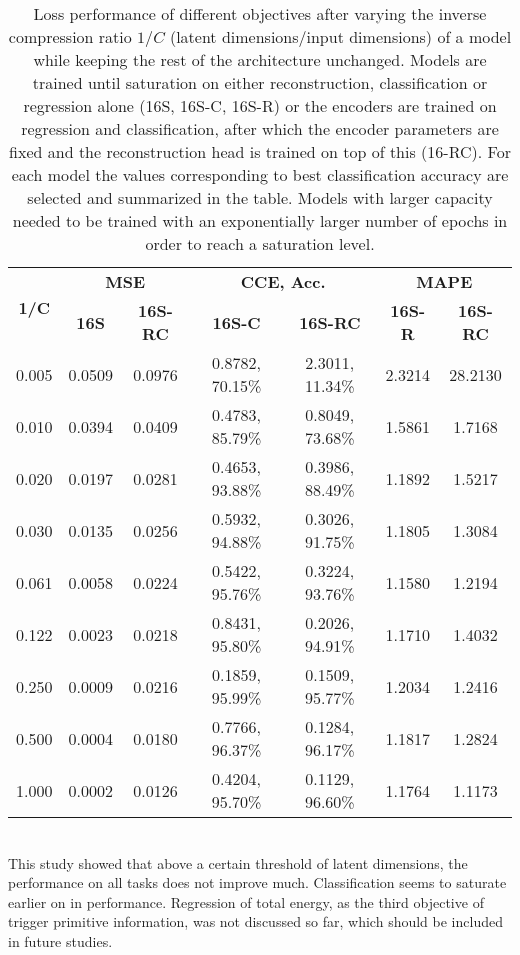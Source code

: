 \documentclass[../../main.tex]{subfiles}
\begin{document}
\begin{table}[htp]
	\centering
	\caption{Loss performance of different objectives after varying the inverse compression ratio $1/C$ (latent dimensions/input dimensions) of a model while keeping the rest of the architecture unchanged. Models are trained until saturation on either reconstruction, classification or regression alone (16S, 16S-C, 16S-R) or the encoders are trained on regression and classification, after which the encoder parameters are fixed and the reconstruction head is trained on top of this (16-RC). For each model the values corresponding to best classification accuracy are selected and summarized in the table. Models with larger capacity needed to be trained with an exponentially larger number of epochs in order to reach a saturation level.}
		\begin{tabular}{ c || c | c | c | c | c | c }
			\multirow{2}{*}{\textbf{1/C}} & \multicolumn{2}{c}{\textbf{MSE}} & \multicolumn{2}{|c}{\textbf{CCE, Acc.}} & \multicolumn{2}{|c}{\textbf{MAPE}}\\
			\cline{2-7}
							& \textbf{16S} & \textbf{16S-RC} & \textbf{16S-C}	 & \textbf{16S-RC}	& \textbf{16S-R}  & \textbf{16S-RC}\\
					\hline
				0.005 & 0.0509			 & 0.0976				   & 0.8782, 70.15\% & 2.3011, 11.34\%	& 2.3214					& 28.2130 \\
				0.010 & 0.0394			 & 0.0409					 & 0.4783, 85.79\% & 0.8049, 73.68\%	& 1.5861					& 1.7168  \\
			  0.020 & 0.0197			 & 0.0281					 & 0.4653, 93.88\% & 0.3986, 88.49\%	& 1.1892				  & 1.5217  \\
				0.030 & 0.0135			 & 0.0256					 & 0.5932, 94.88\% & 0.3026, 91.75\%	& 1.1805					& 1.3084  \\
				0.061 &	0.0058			 & 0.0224 				 & 0.5422, 95.76\% & 0.3224, 93.76\%	&	1.1580					& 1.2194	\\
				0.122 &	0.0023			 & 0.0218		       & 0.8431, 95.80\% & 0.2026, 94.91\%  &	1.1710					& 1.4032  \\
				0.250 &	0.0009			 & 0.0216					 & 0.1859, 95.99\% & 0.1509, 95.77\%  &	1.2034					& 1.2416  \\
				0.500 &	0.0004  		 & 0.0180					 & 0.7766, 96.37\% & 0.1284, 96.17\%  &	1.1817					& 1.2824  \\
				1.000 & 0.0002			 & 0.0126					 & 0.4204, 95.70\% & 0.1129, 96.60\%  &	1.1764					& 1.1173 \\
			\hline
		\end{tabular}
	\label{tab:16latent}
\end{table}
\\
This study showed that above a certain threshold of latent dimensions, the performance on all tasks does not improve much. Classification seems to saturate earlier on in performance. Regression of total energy, as the third objective of trigger primitive information, was not discussed so far, which should be included in future studies.
\end{document}
